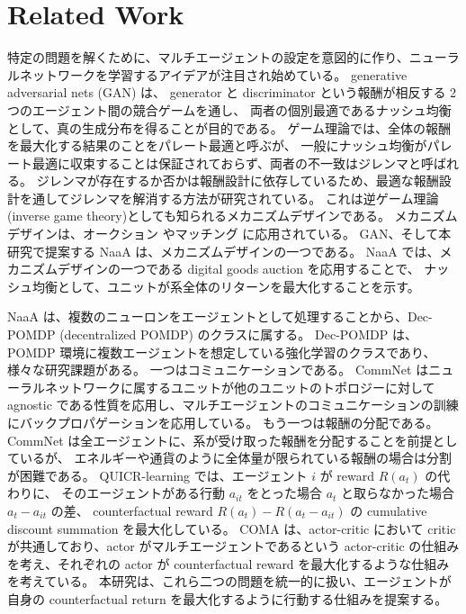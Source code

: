 \section{Related Work}


特定の問題を解くために、マルチエージェントの設定を意図的に作り、ニューラルネットワークを学習するアイデアが注目され始めている。
generative adversarial nets (GAN) \citep{goodfellow2014generative} は、
generator と discriminator という報酬が相反する 2 つのエージェント間の競合ゲームを通し、
両者の個別最適であるナッシュ均衡として、真の生成分布を得ることが目的である。 %
ゲーム理論では、全体の報酬を最大化する結果のことをパレート最適と呼ぶが、
一般にナッシュ均衡がパレート最適に収束することは保証されておらず、両者の不一致はジレンマと呼ばれる。
ジレンマが存在するか否かは報酬設計に依存しているため、最適な報酬設計を通してジレンマを解消する方法が研究されている。
これは逆ゲーム理論(inverse game theory)としても知られるメカニズムデザイン\citep{myerson1983mechanism}である。
メカニズムデザインは、オークション \citep{vickrey1961counterspeculation} やマッチング \citep{gale1962college} に応用されている。
GAN、そして本研究で提案する NaaA は、メカニズムデザインの一つである。
NaaA では、メカニズムデザインの一つである digital goods auction \citep{guruswami2005profit} を応用することで、
ナッシュ均衡として、ユニットが系全体のリターンを最大化することを示す。

NaaA は、複数のニューロンをエージェントとして処理することから、Dec-POMDP (decentralized POMDP) のクラスに属する。
Dec-POMDP は、POMDP 環境に複数エージェントを想定している強化学習のクラスであり、様々な研究課題がある。
一つはコミュニケーションである。
CommNet \citep{sukhbaatar2016learning} はニューラルネットワークに属するユニットが他のユニットのトポロジーに対して agnostic である性質を応用し、マルチエージェントのコミュニケーションの訓練にバックプロパゲーションを応用している。
もう一つは報酬の分配である。CommNet は全エージェントに、系が受け取った報酬を分配することを前提としているが、
エネルギーや通貨のように全体量が限られている報酬の場合は分割が困難である。
QUICR-learning \citep{agogino2006quicr} では、エージェント $i$ が reward $R(a_t)$ の代わりに、
そのエージェントがある行動 $a_{it}$ をとった場合 $a_t$ と取らなかった場合 $a_t-a_{it}$ の差、
counterfactual reward $R(a_t) - R(a_t - a_{it})$ の cumulative discount summation を最大化している。
COMA \citep{foerster2017counterfactual} は、actor-critic において critic が共通しており、actor がマルチエージェントであるという actor-critic の仕組みを考え、それぞれの actor が counterfactual reward を最大化するような仕組みを考えている。
本研究は、これら二つの問題を統一的に扱い、エージェントが自身の counterfactual return を最大化するように行動する仕組みを提案する。

